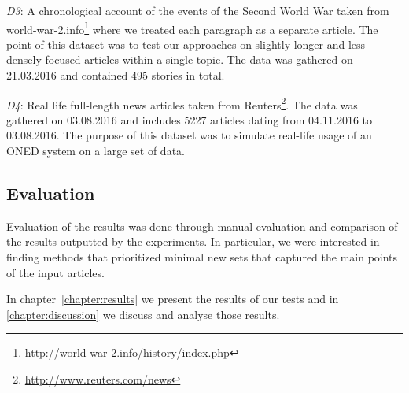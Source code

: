 \emph{D3}: A chronological account of the events of the Second World War taken from world-war-2.info\footnote{\url{http://world-war-2.info/history/index.php}} where we treated each paragraph as a separate article. The point of this dataset was to test our approaches on slightly longer and less densely focused articles within a single topic. The data was gathered on 21.03.2016 and contained 495 stories in total.

\emph{D4}: Real life full-length news articles taken from Reuters\footnote{\url{http://www.reuters.com/news}}. The data was gathered on 03.08.2016 and includes 5227 articles dating from 04.11.2016 to 03.08.2016. The purpose of this dataset was to simulate real-life usage of an ONED system on a large set of data.

\subsection{Evaluation}
Evaluation of the results was done through manual evaluation and comparison of the results outputted by the experiments. In particular, we were interested in finding methods that prioritized minimal new sets that captured the main points of the input articles. 


In chapter~\ref{chapter:results} we present the results of our tests and in \cref{chapter:discussion} we discuss and analyse those results.
